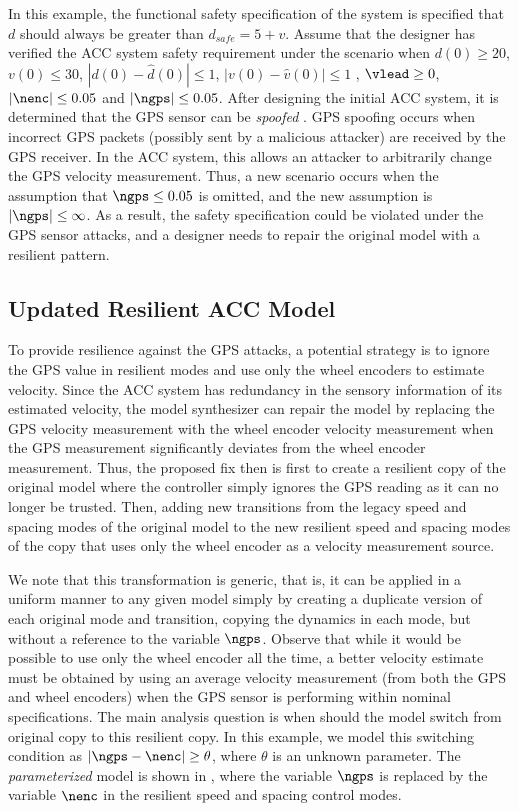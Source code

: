In this example, the functional safety specification of the system is specified that $d$ should always be greater than $d_{safe} = 5 + v$. Assume that the designer has verified the ACC system safety requirement under the scenario when $d(0) \geq 20$, $v(0) \leq 30$, $|d(0) - \hat{d}(0)| \leq 1$, $|v(0) - \hat{v}(0)| \leq 1$ , $\vlead \geq 0$, $|\nenc| \leq 0.05$ and $|\ngps| \leq 0.05$.
%
After designing the initial ACC system, it is determined that the GPS sensor can be \emph{spoofed} \cite{tippenhauer2011requirements, kerns2014unmanned}. GPS spoofing occurs when incorrect GPS packets (possibly sent by a malicious attacker) are received by the GPS receiver. In the ACC system, this allows an attacker to arbitrarily change the GPS velocity measurement. 
%
Thus, a new scenario occurs when the assumption that $\ngps \leq 0.05$ is omitted, and the new assumption is $|\ngps| \leq \infty$.
As a result, the safety specification could be violated under the GPS sensor attacks, and a designer needs to repair the original model with a resilient pattern. 

\subsection{Updated Resilient ACC Model}
%
To provide resilience against the GPS attacks, a potential strategy is to ignore the GPS value in resilient modes and use only the wheel encoders to estimate velocity. Since the ACC system has redundancy in the sensory information of its estimated velocity, the model synthesizer can repair the model by replacing the GPS velocity measurement with the wheel encoder velocity measurement when the GPS measurement significantly deviates from the wheel encoder measurement.
%
%
Thus, the proposed fix then is first to create a resilient copy of the original model where the controller simply ignores the GPS reading as it can no longer be trusted. Then, adding new transitions from the legacy speed and spacing modes of the original model to the new resilient speed and spacing modes of the copy that uses only the wheel encoder as a velocity measurement source.
%

We note that this transformation is generic, that is, it can be applied in a uniform manner to any given model simply by creating a duplicate version of each original mode and transition, copying the dynamics in each mode, but without a reference to the variable $\ngps$. 
%
%
Observe that while it would be possible to use only the wheel encoder all the time, a better velocity estimate must be obtained by using an average velocity measurement (from both the GPS and wheel encoders) when the GPS sensor is performing within nominal specifications. The main analysis question is when should the model switch from original copy to this resilient copy.  In this example, we model this switching condition as $|\ngps -\nenc| \geq \theta$, where $\theta$ is an unknown parameter. The \emph{parameterized} model is shown in , where the variable $\ngps$ is replaced by the variable $\nenc$ in the resilient speed and spacing control modes.


